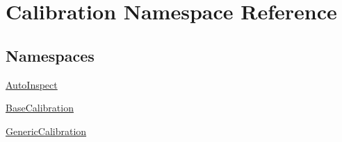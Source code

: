 \hypertarget{namespace_calibration}{}\section{Calibration Namespace Reference}
\label{namespace_calibration}
\subsection*{Namespaces}
\begin{DoxyCompactItemize}
\item 
 \hyperlink{namespace_calibration_1_1_auto_inspect}{Auto\+Inspect}
\item 
 \hyperlink{namespace_calibration_1_1_base_calibration}{Base\+Calibration}
\item 
 \hyperlink{namespace_calibration_1_1_generic_calibration}{Generic\+Calibration}
\end{DoxyCompactItemize}
